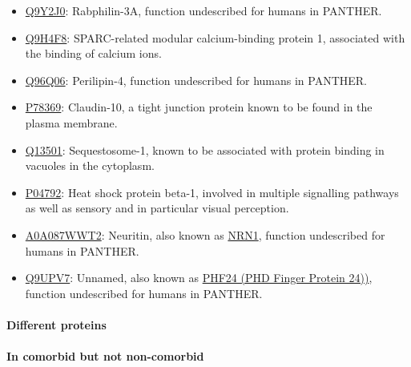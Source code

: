 \begin{itemize}
\item \href{http://www.pantherdb.org/genes/gene.do?acc=HUMAN\%7CHGNC\%3D17056\%7CUniProtKB\%3DQ9Y2J0}{Q9Y2J0}: Rabphilin-3A, function undescribed for humans in PANTHER.
\item \href{http://www.pantherdb.org/genes/gene.do?acc=HUMAN\%7CHGNC\%3D20318\%7CUniProtKB\%3DQ9H4F8}{Q9H4F8}: SPARC-related modular calcium-binding protein 1, associated with the binding of calcium ions.
\item \href{http://www.pantherdb.org/genes/gene.do?acc=HUMAN\%7CHGNC\%3D29393\%7CUniProtKB\%3DQ96Q06}{Q96Q06}: Perilipin-4, function undescribed for humans in PANTHER.
\item \href{http://www.pantherdb.org/genes/gene.do?acc=HUMAN\%7CHGNC\%3D2033\%7CUniProtKB\%3DP78369}{P78369}: Claudin-10,  a tight junction protein known to be found in the plasma membrane.
\item \href{http://www.pantherdb.org/genes/gene.do?acc=HUMAN\%7CHGNC\%3D11280\%7CUniProtKB\%3DQ13501}{Q13501}: Sequestosome-1, known to be associated with protein binding in vacuoles in the cytoplasm.
\item \href{http://www.pantherdb.org/genes/gene.do?acc=HUMAN\%7CHGNC\%3D5246\%7CUniProtKB\%3DP04792}{P04792}: Heat shock protein beta-1, involved in multiple signalling pathways as well as sensory and in particular visual perception.
\item \href{http://www.pantherdb.org/genes/gene.do?acc=HUMAN\%7CHGNC\%3D17972\%7CUniProtKB\%3DQ9NPD7}{A0A087WWT2}: Neuritin, also known as \href{https://www.uniprot.org/uniprot/A0A087WWT2}{NRN1}, function undescribed for humans in PANTHER.
\item \href{http://www.pantherdb.org/genes/gene.do?acc=HUMAN\%7CHGNC\%3D29180\%7CUniProtKB\%3DQ9UPV7}{Q9UPV7}: Unnamed, also known as \href{https://www.uniprot.org/uniprot/Q9UPV7}{PHF24 (PHD Finger Protein 24))}, function undescribed for humans in PANTHER.
\end{itemize}

\paragraph{Different proteins}

\paragraph{In comorbid but not non-comorbid}

